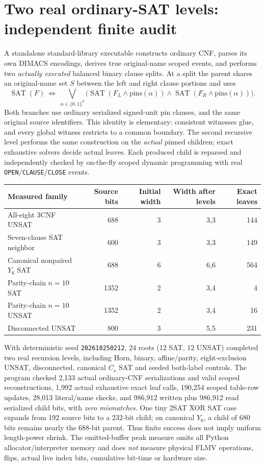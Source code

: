 \documentclass[11pt]{article}
\begin{document}
\section{Two real ordinary-SAT levels: independent finite audit}
A standalone standard-library executable constructs ordinary CNF,
parses its own DIMACS encodings, derives true original-name scoped
events, and performs two \emph{actually executed} balanced binary
clause splits. At a split the parent shares an original-name set
$S$ between the left and right clause portions and uses
\[
\operatorname{SAT}(F)
\ \Longleftrightarrow\
\bigvee_{\alpha\in\{0,1\}^{S}}
\big(\operatorname{SAT}(F_L\wedge\mathrm{pins}(\alpha))
\land\operatorname{SAT}(F_R\wedge\mathrm{pins}(\alpha))\big).
\]
Both branches use ordinary serialized signed-unit pin clauses,
and the same original source identifiers. This identity is
elementary: consistent witnesses glue, and every global witness
restricts to a common boundary. The second recursive level
performs the same construction on the \emph{actual} pinned
children; exact exhaustive solvers decide actual leaves.
Each produced child is reparsed and independently checked by
on-the-fly scoped dynamic programming with real
\texttt{OPEN}/\texttt{CLAUSE}/\texttt{CLOSE} events.

\begin{center}
\begin{tabular}{lrrrr}
\toprule
Measured family & Source bits & Initial width & Width after levels & Exact leaves\\\midrule
All-eight 3CNF UNSAT &688&3&3,3&144\\
Seven-clause SAT neighbor &600&3&3,3&149\\
Canonical nonpaired $Y_6$ SAT &688&6&6,6&564\\
Parity-chain $n=10$ SAT &1352&2&3,4&4\\
Parity-chain $n=10$ UNSAT &1352&2&3,4&16\\
Disconnected UNSAT &800&3&5,5&231\\
\bottomrule
\end{tabular}
\end{center}
With deterministic seed \texttt{202610250212}, 24 roots
(12 SAT, 12 UNSAT) completed two real recursion levels,
including Horn, binary, affine/parity, eight-exclusion UNSAT,
disconnected, canonical $C_\star$ SAT and seeded both-label
controls. The program checked 2,133 actual ordinary-CNF
serializations and valid scoped reconstructions, 1,992 actual
exhaustive exact leaf calls, 190,254 scoped table-row updates,
28,013 literal/name checks, and 986,912 written plus 986,912
read serialized child bits, with \emph{zero mismatches}.
One tiny 2SAT XOR SAT case expands from 192 source bits to a
232-bit child; on canonical $Y_6$, a child of 680 bits remains
nearly the 688-bit parent. Thus finite success does not imply
uniform length-power shrink. The emitted-buffer peak
measure omits all Python allocator/interpreter memory and
does \emph{not} measure physical FLMV operations, flips,
actual live index bits, cumulative bit-time or hardware size.
\end{document}

